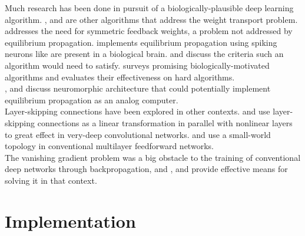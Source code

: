 \documentclass[format=sigconf]{acmart}
\newcommand{\npar}{\\\indent}
\begin{document}
Much research has been done in pursuit of a biologically-plausible deep learning algorithm. \cite{lee2015}, \cite{xie2003} and \cite{pineda1987} are other algorithms that address the weight transport problem. \cite{lillicrap2014} addresses the need for symmetric feedback weights, a problem not addressed by equilibrium propagation. \cite{oconnor2018} implements equilibrium propagation using spiking neurons like are present in a biological brain. \cite{bengio2015} and \cite{???} discuss the criteria such an algorithm would need to satisfy. \cite{bartunov2018} surveys promising biologically-motivated algorithms and evaluates their effectiveness on hard algorithms.
\npar
\cite{shainline2019}, \cite{davies2018} and \cite{nahmias2013} discuss neuromorphic architecture that could potentially implement equilibrium propagation as an analog computer.
\npar
Layer-skipping connections have been explored in other contexts. \cite{he2015} and \cite{srivastava2015} use layer-skipping connections as a linear transformation in parallel with nonlinear layers to great effect in very-deep convolutional networks. \cite{xiaohu2011} and \cite{krishnan2019} use a small-world topology in conventional multilayer feedforward networks.
\npar
The vanishing gradient problem was a big obstacle to the training of conventional deep networks through backpropagation, and \cite{ioffe2015}, \cite{glorot2010} and \cite{???} provide effective means for solving it in that context.



\section{Implementation}
\end{document}
